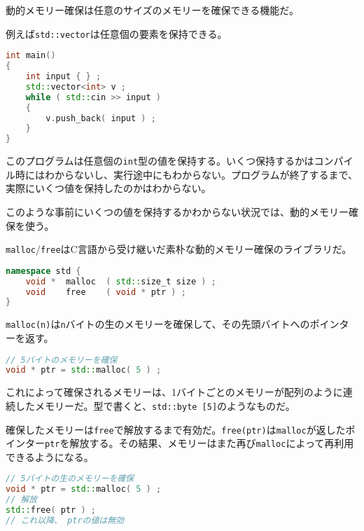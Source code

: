 

動的メモリー確保は任意のサイズのメモリーを確保できる機能だ。

例えば\texttt{std::vector}は任意個の要素を保持できる。

\begin{lstlisting}[language={C++}]
int main()
{
    int input { } ;
    std::vector<int> v ;
    while ( std::cin >> input )
    {
        v.push_back( input ) ;
    }
}
\end{lstlisting}

このプログラムは任意個の\texttt{int}型の値を保持する。いくつ保持するかはコンパイル時にはわからないし、実行途中にもわからない。プログラムが終了するまで、実際にいくつ値を保持したのかはわからない。

このような事前にいくつの値を保持するかわからない状況では、動的メモリー確保を使う。

\clearpage
{}

\texttt{malloc}/\texttt{free}はC言語から受け継いだ素朴な動的メモリー確保のライブラリだ。

\begin{lstlisting}[language={C++}]
namespace std {
    void *  malloc  ( std::size_t size ) ;
    void    free    ( void * ptr ) ;
}
\end{lstlisting}

\texttt{malloc(n)}は\texttt{n}バイトの生のメモリーを確保して、その先頭バイトへのポインターを返す。

\begin{lstlisting}[language={C++}]
// 5バイトのメモリーを確保
void * ptr = std::malloc( 5 ) ;
\end{lstlisting}

これによって確保されるメモリーは、1バイトごとのメモリーが配列のように連続したメモリーだ。型で書くと、\texttt{std::byte [5]}のようなものだ。

確保したメモリーは\texttt{free}で解放するまで有効だ。\texttt{free(ptr)}は\texttt{malloc}が返したポインター\texttt{ptr}を解放する。その結果、メモリーはまた再び\texttt{malloc}によって再利用できるようになる。

\begin{lstlisting}[language={C++}]
// 5バイトの生のメモリーを確保
void * ptr = std::malloc( 5 ) ;
// 解放
std::free( ptr ) ;
// これ以降、 ptrの値は無効
\end{lstlisting}

